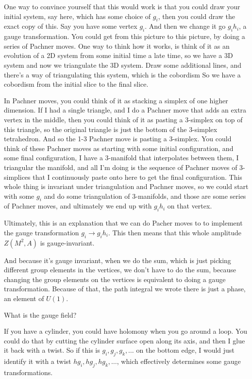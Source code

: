 One way to convince yourself that this would work is that you could draw your
initial system,
say here,
which has some choice of $g_i$,
then you could draw the exact copy of this.
Say you have some vertex $g_i$.
And then we change it go $g_i h_i$,
a gauge transformation.
You could get from this picture to this picture,
by doing a series of Pachner moves.
One way to think how it works,
is think of it as an evolution of a 2D system from some initial time  a late
time,
so we have a 3D system and now we triangulate the 3D system.
Draw some additional lines,
and there's a way of triangulating this system,
which is the cobordism
So we have a cobordism
from the initial slice to the final slice.

In Pachner moves,
you could think of it as stacking a simplex of one higher dimension.
If I had a single triangle,
and I do a Pachner move that adds an extra vertex in the middle,
then you could think of it as pasting a 3-simplex on top of this triangle,
so the original triangle is just the bottom of the 3-simplex tetrahedron.
And so the 1-3 Pachner move is pasting a 3-simplex.
You could think of these Pachner moves as starting with some initial
configuration,
and some final configuration,
I have a 3-manifold that interpolates between them,
I triangular the manifold,
and all I'm doing is the sequence of Pachner moves of 3-simplices that I
continuously paste onto here to get the final configuration.
This whole thing is invariant under triangulation and Pachner moves,
so we could start with some $g_i$ and do some triangulation of 3-manifolds,
and those are some series of Pachner moves,
and ultimately we end up with $g_i h_i$ on that vertex.

Ultimately,
this is an explanation that we can do Pacher moves to to implement the gauge
transformation $g_i \to g_i h_i$.
This then means that this whole amplitude $Z\left( M^2, A\right)$
is gauge-invariant.

And because it's gauge invariant,
when we do the sum,
which is just picking different group elements in the vertices,
we don't have to do the sum,
because changing the group elements on the vertices is equivalent to doing a
gauge transformation.
Because of that,
the path integral we wrote there is just a phase,
an element of $U(1)$.

\begin{question}
    What is the gauge field?
\end{question}

If you have a cylinder,
you could have holomony when you go around a loop.
You could do that by cutting the cylinder surface open along its axis,
and then I glue it back with a twist.
So if this is $g_i,g_j,g_k,\ldots$ on the bottom edge,
I would just identify it with a twist $hg_i,hg_j,hg_k,\ldots$,
which effectively determines some gauge transformations.


